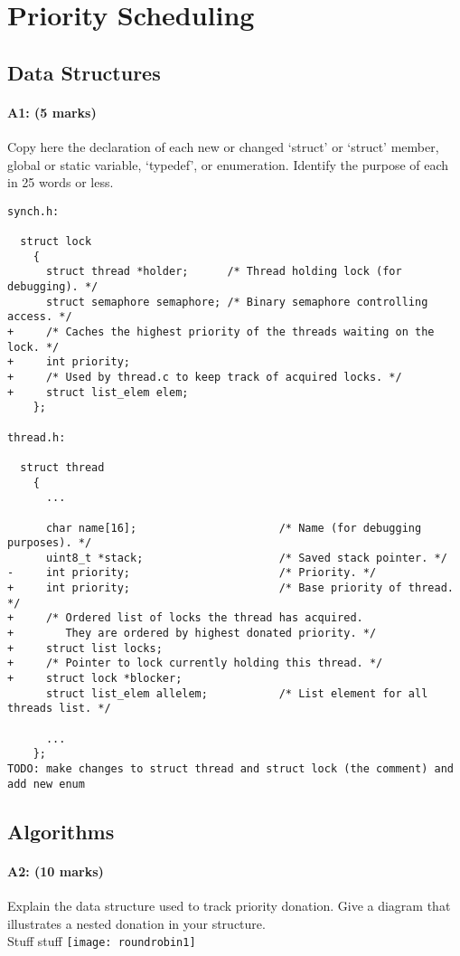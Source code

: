\section{Priority Scheduling}
\subsection{Data Structures}
\paragraph{A1: (5 marks)}
Copy here the declaration of each new or changed `struct' or `struct' member, global or static variable, `typedef', or enumeration.  Identify the purpose of each in 25 words or less.

\begin{verbatim}
synch.h:

  struct lock
    {
      struct thread *holder;      /* Thread holding lock (for debugging). */
      struct semaphore semaphore; /* Binary semaphore controlling access. */
+     /* Caches the highest priority of the threads waiting on the lock. */
+     int priority;
+     /* Used by thread.c to keep track of acquired locks. */
+     struct list_elem elem;
    };

thread.h:
  
  struct thread
    {
      ...

      char name[16];                      /* Name (for debugging purposes). */
      uint8_t *stack;                     /* Saved stack pointer. */
-     int priority;                       /* Priority. */
+     int priority;                       /* Base priority of thread. */
+     /* Ordered list of locks the thread has acquired.
+        They are ordered by highest donated priority. */
+     struct list locks;
+     /* Pointer to lock currently holding this thread. */
+     struct lock *blocker;
      struct list_elem allelem;           /* List element for all threads list. */

      ...
    };
TODO: make changes to struct thread and struct lock (the comment) and add new enum
\end{verbatim}

\subsection{Algorithms}
\paragraph{A2: (10 marks)}
Explain the data structure used to track priority donation. Give a diagram that illustrates a nested donation in your structure.
\\
Stuff stuff
\texttt{[image: roundrobin1]}

